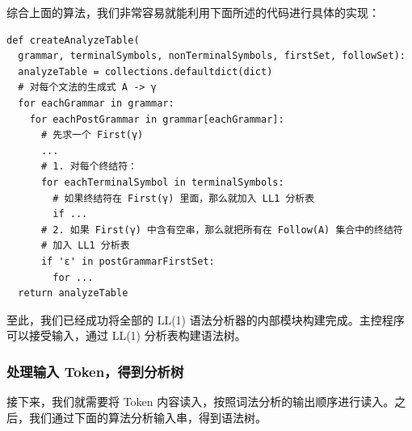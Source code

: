 \documentclass[UTF8]{ctexart}
\begin{document}
综合上面的算法，我们非常容易就能利用下面所述的代码进行具体的实现：

\begin{verbatim}
def createAnalyzeTable(
  grammar, terminalSymbols, nonTerminalSymbols, firstSet, followSet):
  analyzeTable = collections.defaultdict(dict)
  # 对每个文法的生成式 A -> γ
  for eachGrammar in grammar:
    for eachPostGrammar in grammar[eachGrammar]:
      # 先求一个 First(γ)
      ...
      # 1. 对每个终结符：
      for eachTerminalSymbol in terminalSymbols:
        # 如果终结符在 First(γ) 里面，那么就加入 LL1 分析表
        if ...
      # 2. 如果 First(γ) 中含有空串，那么就把所有在 Follow(A) 集合中的终结符
      # 加入 LL1 分析表
      if 'ε' in postGrammarFirstSet:
        for ...
  return analyzeTable
\end{verbatim}

至此，我们已经成功将全部的 LL(1) 语法分析器的内部模块构建完成。主控程序可以接受输入，通过 LL(1) 分析表构建语法树。

\subsubsection{处理输入 Token，得到分析树}
接下来，我们就需要将 Token 内容读入，按照词法分析的输出顺序进行读入。之后，我们通过下面的算法分析输入串，得到语法树。

\noindent{}
\end{document}
